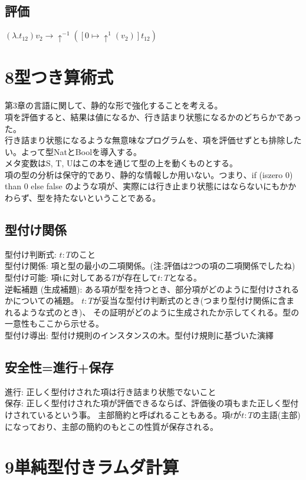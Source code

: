 \documentclass[a4paper,10pt]{article}
\begin{document}
\subsection*{評価}
$(\lambda. t_{12}) v_2 \rightarrow \uparrow^{-1}([0 \mapsto \uparrow^{1}(v_2)]t_{12})$

\section*{8型つき算術式}
第3章の言語に関して、静的な形で強化することを考える。 \\
項を評価すると、結果は値になるか、行き詰まり状態になるかのどちらかであった。\\
行き詰まり状態になるような無意味なプログラムを、項を評価せずとも排除したい。よって型NatとBoolを導入する。\\
メタ変数はS, T, Uはこの本を通じて型の上を動くものとする。\\
項の型の分析は保守的であり、静的な情報しか用いない。つまり、if (iszero 0) than 0 else false
のような項が、実際には行き止まり状態にはならないにもかかわらず、型を持たないということである。
\subsection*{型付け関係}
型付け判断式: $t:T$のこと\\
型付け関係: 項と型の最小の二項関係。(注:評価は2つの項の二項関係でしたね)\\
型付け可能: 項tに対してある$T$が存在して$t:T$となる。\\
逆転補題 (生成補題): ある項が型を持つとき、部分項がどのように型付けされるかについての補題。
$t:T$が妥当な型付け判断式のとき(つまり型付け関係に含まれるような式のとき)、
その証明がどのように生成されたか示してくれる。型の一意性もここから示せる。\\
型付け導出: 型付け規則のインスタンスの木。型付け規則に基づいた演繹\\
\subsection*{安全性=進行+保存}
進行: 正しく型付けされた項は行き詰まり状態でないこと\\
保存: 正しく型付けされた項が評価できるならば、評価後の項もまた正しく型付けされているという事。
主部簡約と呼ばれることもある。項$t$が$t:T$の主語(主部)になっており、主部の簡約のもとこの性質が保存される。
\section*{9単純型付きラムダ計算}
\end{document}
